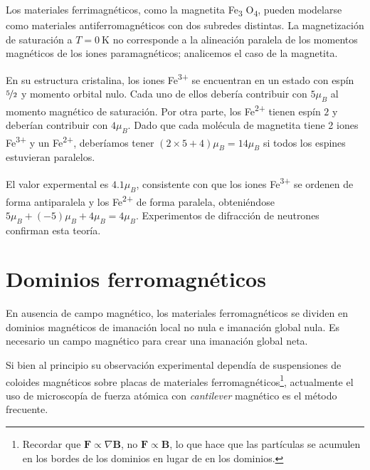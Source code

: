 \documentclass{tufte-book}
\newcommand{\sub}[1]{_{{\scriptscriptstyle\mathit{#1}}}}
\newcommand{\mb}{μ\sub{B}}
\begin{document}
Los materiales ferrimagnéticos, como la magnetita Fe\textsubscript{3}
O\textsubscript{4}, pueden modelarse como materiales
antiferromagnéticos con dos subredes distintas. La magnetización de
saturación a $T=\SI{0}{\kelvin}$ no corresponde a la alineación
paralela de los momentos magnéticos de los iones paramagnéticos;
analicemos el caso de la magnetita.

En su estructura cristalina, los iones Fe\textsuperscript{3+} se
encuentran en un estado con espín $\nicefrac{5}{2}$ y momento orbital
nulo. Cada uno de ellos debería contribuir con $5\mb$ al momento
magnético de saturación. Por otra parte, los Fe\textsuperscript{2+}
tienen espín $2$ y deberían contribuir con $4\mb$. Dado que cada
molécula de magnetita tiene 2 iones Fe\textsuperscript{3+} y un
Fe\textsuperscript{2+}, deberíamos tener $(2×5 + 4)\mb = 14\mb$ si
todos los espines estuvieran paralelos.

El valor expermental es $4.1\mb$, consistente con que los iones
Fe\textsuperscript{3+} se ordenen de forma antiparalela y los
Fe\textsuperscript{2+} de forma paralela, obteniéndose
$5\mb+(-5)\mb+4\mb = 4\mb$. Experimentos de difracción de neutrones
confirman esta teoría.



\section{Dominios ferromagnéticos}

En ausencia de campo magnético, los materiales ferromagnéticos se
dividen en dominios magnéticos de imanación local no nula e imanación
global nula. Es necesario un campo magnético para crear una imanación
global neta.

Si bien al principio su observación experimental dependía de
suspensiones de coloides magnéticos sobre placas de materiales
ferromagnéticos\footnote{Recordar que $\symbf{F}∝∇\symbf{B}$, no
  $\symbf{F}∝\symbf{B}$, lo que hace que las partículas se acumulen
  en los bordes de los dominios en lugar de en los dominios.},
actualmente el uso de microscopía de fuerza atómica con
\textit{cantilever} magnético es el método frecuente.
\end{document}

